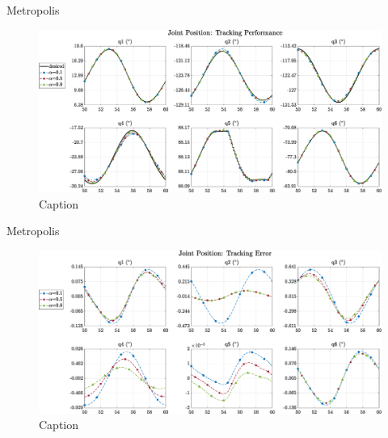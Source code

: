 \documentclass[10pt]{beamer}
\begin{document}
\begin{frame}[fragile]{Metropolis}

  \begin{figure}
      \centering
      \hspace*{-0.7cm}\includegraphics[width=1.1\linewidth]{img/articular_SMCi_position_compare.eps}
      \caption{Caption}
      \label{fig:my_label}
  \end{figure}

\end{frame}

\begin{frame}[fragile]{Metropolis}

  \begin{figure}
      \centering
      \hspace*{-0.7cm}\includegraphics[width=1.1\linewidth]{img/articular_SMCi_position_error_compare.eps}
      \caption{Caption}
      \label{fig:my_label}
  \end{figure}

\end{frame}
\end{document}
